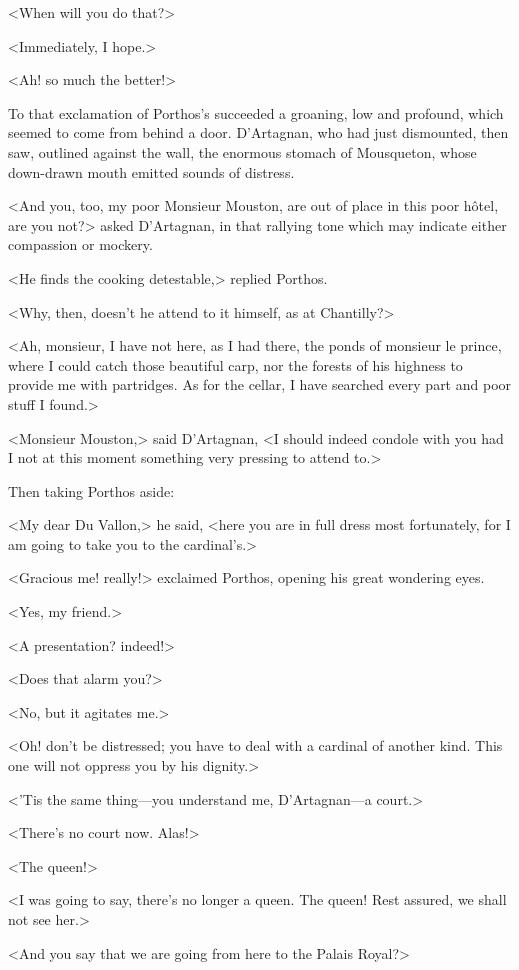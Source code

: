 <When will you do that?>

<Immediately, I hope.>

<Ah! so much the better!>

To that exclamation of Porthos's succeeded a groaning, low and profound, which seemed to come from behind a door. D'Artagnan, who had just dismounted, then saw, outlined against the wall, the enormous stomach of Mousqueton, whose down-drawn mouth emitted sounds of distress.

<And you, too, my poor Monsieur Mouston, are out of place in this poor hôtel, are you not?> asked D'Artagnan, in that rallying tone which may indicate either compassion or mockery.

<He finds the cooking detestable,> replied Porthos.

<Why, then, doesn't he attend to it himself, as at Chantilly?>

<Ah, monsieur, I have not here, as I had there, the ponds of monsieur le prince, where I could catch those beautiful carp, nor the forests of his highness to provide me with partridges. As for the cellar, I have searched every part and poor stuff I found.>

<Monsieur Mouston,> said D'Artagnan, <I should indeed condole with you had I not at this moment something very pressing to attend to.>

Then taking Porthos aside:

<My dear Du Vallon,> he said, <here you are in full dress most fortunately, for I am going to take you to the cardinal's.>

<Gracious me! really!> exclaimed Porthos, opening his great wondering eyes.

<Yes, my friend.>

<A presentation? indeed!>

<Does that alarm you?>

<No, but it agitates me.>

<Oh! don't be distressed; you have to deal with a cardinal of another kind. This one will not oppress you by his dignity.>

<'Tis the same thing—you understand me, D'Artagnan—a court.>

<There's no court now. Alas!>

<The queen!>

<I was going to say, there's no longer a queen. The queen! Rest assured, we shall not see her.>

<And you say that we are going from here to the Palais Royal?>

